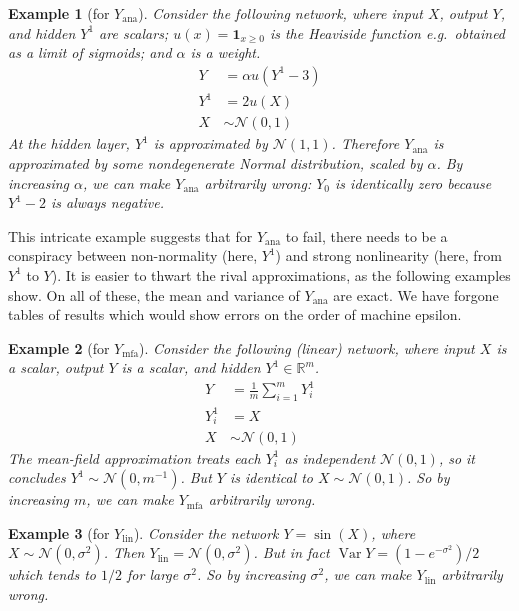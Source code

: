\documentclass{article}
\newtheorem{example}{Example}
\DeclareMathOperator{\Var}{\operatorname{Var}}
\begin{document}
\begin{example}[for \(Y_\mathrm{ana}\)]
  Consider the following network, where input \(X\), output \(Y\), and hidden \(Y^1\) are scalars; \(u(x) = \bm{1}_{x \geq 0}\) is the Heaviside function e.g.~obtained as a limit of sigmoids; and \(\alpha\) is a weight.
  \begin{align*}
    Y &= \alpha u(Y^1 - 3)
    \\
    Y^1 &= 2 u(X)
    \\
    X &\sim \mathcal N(0, 1)
  \end{align*}
  At the hidden layer, \(Y^1 \) is approximated by \(\mathcal N(1, 1)\).
  Therefore \(Y_\mathrm{ana}\) is approximated by some nondegenerate Normal distribution, scaled by \(\alpha\).
  By increasing \(\alpha\), we can make \(Y_\mathrm{ana}\) arbitrarily wrong:
  \(Y_0\) is identically zero because \(Y^1 -2 \) is always negative.

  
\end{example}

This intricate example suggests that for \(Y_\mathrm{ana}\) to fail, there needs to be a conspiracy between non-normality (here, \(Y^1\)) and strong nonlinearity (here, from \(Y^1\) to \(Y\)).
It is easier to thwart the rival approximations, as the following examples show.
On all of these, the mean and variance of \(Y_\mathrm{ana}\) are exact.
We have forgone tables of results which would show errors on the order of machine epsilon.

\begin{example}[for \(Y_\mathrm{mfa}\)]
  \label{ex:mean-field}
  Consider the   following (linear) network, where input \(X\) is a scalar, output \(Y\) is a scalar, and hidden \(Y^1\in \mathbb{R}^m\).
  \begin{align*}
    Y &= \frac{1}{m} \sum_{i=1}^m Y^1_i
    \\
    Y^1_i &= X
    \\
    X &\sim \mathcal N(0, 1)
  \end{align*}
  The mean-field approximation treats each \(Y_i^1\) as independent \(\mathcal N(0, 1)\), so it concludes \(Y^1\sim \mathcal N(0, m^{-1})\).
  But \(Y\) is identical to \(X\sim \mathcal N(0, 1)\).
  So by increasing \(m\), we can make \(Y_\mathrm{mfa}\) arbitrarily wrong.
\end{example}

\begin{example}[for \(Y_\mathrm{lin}\)]
  Consider the network \(Y = \sin(X)\), where \(X \sim \mathcal N ({0, \sigma^2})\).
  Then \(Y_\mathrm{lin} = \mathcal{N}(0, \sigma^2)\).
  But in fact \(\Var Y = (1 - e^{-\sigma^2})/2\) which tends to \(1/2\) for large \(\sigma^2\).
  So by increasing \(\sigma^2\), we can make \(Y_\mathrm{lin}\) arbitrarily wrong.
\end{example}
\end{document}
